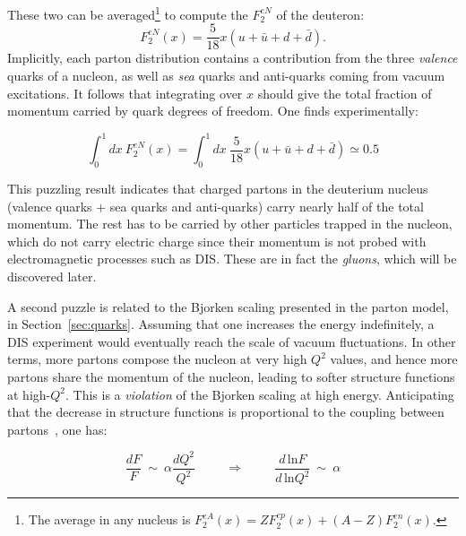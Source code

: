 These two can be averaged\footnote{The average in any nucleus is
  $F_{2}^{eA}(x) = Z F_{2}^{ep}(x) + (A-Z) F_{2}^{en}(x)$.} to compute
the $F_{2}^{eN}$ of the deuteron:
\begin{equation}
F_{2}^{eN}(x) = \frac{5}{18}x\left(u  + \bar{u} + d + \bar{d}  \right).
\end{equation}
Implicitly, each parton distribution contains a contribution from the three
\textit{valence} quarks of a nucleon, as well as \textit{sea} quarks
and anti-quarks coming from vacuum excitations. It follows that integrating over $x$
should give the total fraction of momentum carried by quark degrees of
freedom. One finds experimentally:

\begin{equation}
\int^{1}_{0} dx \: F_{2}^{eN}(x) = \int^{1}_{0} dx\:
\frac{5}{18}x\left(u  + \bar{u} + d + \bar{d}  \right) \simeq 0.5 \label{eqhalftheproton}
\end{equation}


This puzzling result indicates that charged partons in the deuterium nucleus (valence quarks $+$
sea quarks and anti-quarks) carry nearly half of the total
momentum. The rest has to be carried by other particles trapped in the
nucleon, which do not carry electric charge since their momentum is not
probed with electromagnetic processes such as DIS. %
These are in fact the \emph{gluons}, which
will be discovered later.

A second puzzle is related to the Bjorken scaling presented in the
parton model, in Section~\ref{sec:quarks}. Assuming that one increases the energy indefinitely, a
DIS experiment would eventually reach the scale of vacuum
fluctuations. In other terms, more partons compose the nucleon at very
high $Q^{2}$ values, and hence more partons share the momentum of the
nucleon, leading to softer structure functions at high-$Q^{2}$. This
is a \textit{violation} of the Bjorken scaling at high energy. Anticipating
that the decrease in structure functions is proportional to the
coupling between partons~\cite{qcd_book}, one has:

\begin{equation}
\frac{dF}{F} \:\sim\: \alpha\frac{dQ^{2}}{Q^{2}} \hspace{1cm}\Longrightarrow\hspace{1cm}
\frac{d\,\textrm{ln}F}{d\,\textrm{ln}Q^{2}} \:\sim\: \alpha
\label{eq:couplingeq}
\end{equation}

